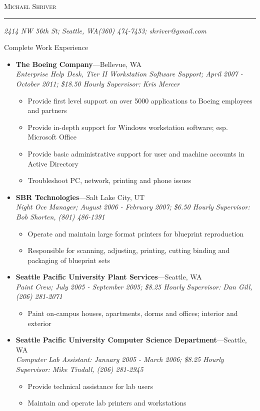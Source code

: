 \documentclass[11pt,oneside]{article}
\makeatletter
\newcommand{\name}{Michael Shriver}
\newcommand{\addr}{2414 NW 56th St; Seattle, WA}
\newcommand{\phone}{(360) 474-7453}
\newcommand{\email}{shriver@gmail.com}
\newcommand{\bigname}[1]{
    \begin{flushleft}\fontfamily{phv}\selectfont\Huge\scshape#1\end{flushleft}
}
\newenvironment{ressection}[1]{
    \vspace{4pt}
    {\fontfamily{phv}\selectfont\Large#1}
    \begin{itemize}
    \vspace{3pt}
}{
    \end{itemize}
}
\newcommand{\ressubitem}[1]{
    \vspace{-1pt}
    \item \begin{flushleft} #1 \end{flushleft}
}
\newenvironment{ressubsec}[4]{
    \item
    \textbf{#1}---#2 \\
    \textit{#3}
    \newline
    \textit{#4}
    \vspace{-2pt}
    \begin{itemize}
}{
    \end{itemize}
}
\makeatother
\begin{document}
 \selectfont

\bigname{\name}
\vspace{-8pt} \rule{\textwidth}{1pt}

\vspace{-1pt} {\small\itshape \addr \hfill \phone; \email}

\vspace{8 pt}


\begin{ressection}{Complete Work Experience}

    \begin{ressubsec}{The Boeing Company}{Bellevue, WA}{Enterprise Help Desk, Tier II Workstation Software Support; April 2007 - October 2011; \$18.50 Hourly}{Supervisor: Kris Mercer}
        \ressubitem{Provide first level support on over 5000 applications to Boeing employees and partners}
        \ressubitem{Provide in-depth support for Windows workstation software; esp. Microsoft Office}
        \ressubitem{Provide basic administrative support for user and machine accounts in Active Directory}
        \ressubitem{Troubleshoot PC, network, printing and phone issues}    
    \end{ressubsec}

    \begin{ressubsec}{SBR Technologies}{Salt Lake City, UT}{Night Oce Manager; August 2006 - February 2007; \$6.50 Hourly}{Supervisor: Bob Shorten, (801) 486-1391}
        \ressubitem{Operate and maintain large format printers for blueprint reproduction}
        \ressubitem{Responsible for scanning, adjusting, printing, cutting binding and packaging of blueprint sets}
    \end{ressubsec}

    \begin{ressubsec}{Seattle Pacific University Plant Services}{Seattle, WA}{Paint Crew; July 2005 - September 2005; \$8.25 Hourly}{Supervisor: Dan Gill, (206) 281-2071}
        \ressubitem{Paint on-campus houses, apartments, dorms and offices; interior and exterior}
    \end{ressubsec}

    \begin{ressubsec}{Seattle Pacific University Computer Science Department}{Seattle, WA}{Computer Lab Assistant: January 2005 - March 2006; \$8.25 Hourly}{Supervisor: Mike Tindall, (206) 281-2945}
        \ressubitem{Provide technical assistance for lab users}
        \ressubitem{Maintain and operate lab printers and workstations}
    \end{ressubsec}


\end{ressection}
\end{document}
